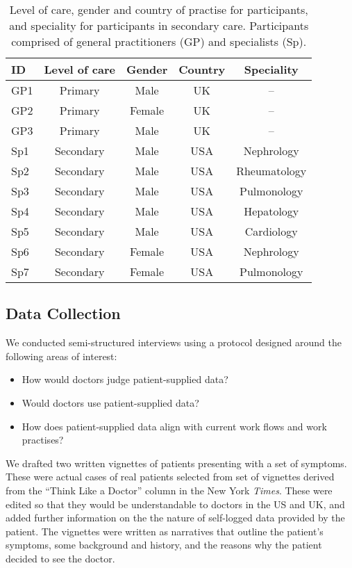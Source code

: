 \documentclass{sigchi}
\begin{document}
\begin{table}[t]
    \centering
    \setlength\extrarowheight{0.0cm}
    \begin{tabular}{lcccc}
     \toprule
     ID & Level of care & Gender & Country & Speciality \\ \midrule
     GP1 & Primary & Male & UK & -- \\
     GP2 & Primary & Female & UK & -- \\
     GP3 & Primary & Male & UK & -- \\
     
     Sp1 & Secondary & Male & USA & Nephrology \\
     Sp2 & Secondary & Male & USA & Rheumatology \\
     Sp3 & Secondary & Male & USA & Pulmonology \\
     Sp4 & Secondary & Male & USA & Hepatology \\
     Sp5 & Secondary & Male & USA & Cardiology \\
     Sp6 & Secondary & Female & USA & Nephrology \\
     Sp7 & Secondary & Female & USA & Pulmonology \\
     \bottomrule
    \end{tabular}
    \caption{Level of care, gender and country of practise for participants, and speciality for participants in secondary care. Participants comprised of general practitioners (GP) and specialists (Sp).}
    \label{tab:participants}
\end{table}

\subsection{Data Collection}
We conducted semi-structured interviews using a protocol designed around the following areas of interest:
\begin{itemize}
    \item How would doctors judge patient-supplied data?
    \item Would doctors use patient-supplied data?
    \item How does patient-supplied data align with current work flows and work practises?
\end{itemize}

We drafted two written vignettes of patients presenting with a set of symptoms.  These were actual cases of real patients selected from set of vignettes derived from the ``Think Like a Doctor'' column in the New York \emph{Times}.  These were edited  so that they would be understandable to doctors in the US and UK, and added further information on the the nature of self-logged data provided by the patient.  The vignettes were written as narratives that outline the patient's symptoms, some background and history, and the reasons why the patient decided to see the doctor.  
\end{document}
